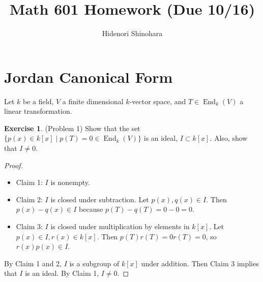 \documentclass[12pt, psamsfonts]{amsart}
\theoremstyle{definition}
\newtheorem*{exer}{Exercise}
\theoremstyle{remark}
\DeclareMathOperator{\End}{End}
\numberwithin{equation}{section}
\begin{document}
\title{Math 601 Homework (Due 10/16)}
\author{Hidenori Shinohara}
\maketitle

\tableofcontents

\section{Jordan Canonical Form}

Let $k$ be a field, $V$ a finite dimensional $k$-vector space, and $T \in \End_k(V)$ a linear transformation.

\begin{exer}{(Problem 1)}
  Show that the set $\{ p(x) \in k[x] \mid p(T) = 0 \in \End_k(V) \}$ is an ideal, $I \subset k[x]$.
  Also, show that $I \ne 0$.
\end{exer}

\begin{proof}
$ $
 \begin{itemize}
   \item
    Claim 1: $I$ is nonempty.
   \item
    Claim 2: $I$ is closed under subtraction.
    Let $p(x), q(x) \in I$.
    Then $p(x) - q(x) \in I$ because $p(T) - q(T) = 0 - 0 = 0$.
   \item
    Claim 3: $I$ is closed under multiplication by elements in $k[x]$.
    Let $p(x) \in I, r(x) \in k[x]$.
    Then $p(T)r(T) = 0r(T) = 0$, so $r(x)p(x) \in I$.
 \end{itemize}
 By Claim 1 and 2, $I$ is a subgroup of $k[x]$ under addition.
 Then Claim 3 implies that $I$ is an ideal.
 By Claim 1, $I \ne 0$.
\end{proof}
\end{document}

